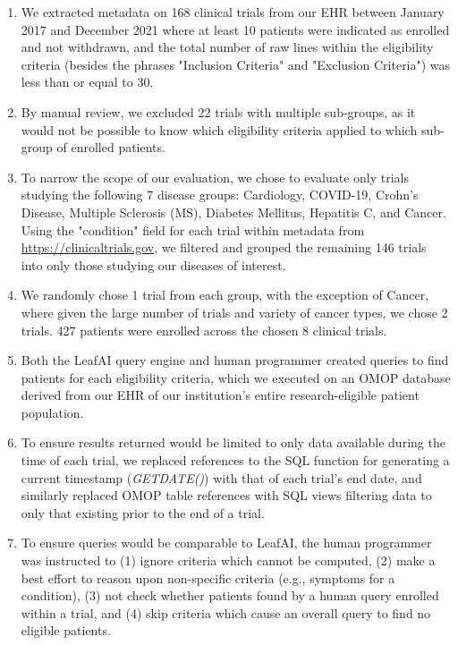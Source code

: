 \documentclass[../main.tex]{subfiles}
\begin{document}
\begin{enumerate}
    \item We extracted metadata on 168 clinical trials from our EHR between January 2017 and December 2021 where at least 10 patients were indicated as enrolled and not withdrawn, and the total number of raw lines within the eligibility criteria (besides the phrases "Inclusion Criteria" and "Exclusion Criteria") was less than or equal to 30.
    \item By manual review, we excluded 22 trials with multiple sub-groups, as it would not be possible to know which eligibility criteria applied to which sub-group of enrolled patients.
    \item To narrow the scope of our evaluation, we chose to evaluate only trials studying the following 7 disease groups: Cardiology, COVID-19, Crohn's Disease, Multiple Sclerosis (MS), Diabetes Mellitus, Hepatitis C, and Cancer. Using the "condition" field for each trial within metadata from \url{https://clinicaltrials.gov}, we filtered and grouped the remaining 146 trials into only those studying our diseases of interest. 
    \item We randomly chose 1 trial from each group, with the exception of Cancer, where given the large number of trials and variety of cancer types, we chose 2 trials. 427 patients were enrolled across the chosen 8 clinical trials.
    \item Both the LeafAI query engine and human programmer created queries to find patients for each eligibility criteria, which we executed on an OMOP database derived from our EHR of our institution's entire research-eligible patient population. 
    \item To ensure results returned would be limited to only data available during the time of each trial, we replaced references to the SQL function for generating a current timestamp (\textit{GETDATE()}) with that of each trial's end date, and similarly replaced OMOP table references with SQL views filtering data to only that existing prior to the end of a trial.
    \item To ensure queries would be comparable to LeafAI, the human programmer was instructed to (1) ignore criteria which cannot be computed, (2) make a best effort to reason upon non-specific criteria (e.g., symptoms for a condition), (3) not check whether patients found by a human query enrolled within a trial, and (4) skip criteria which cause an overall query to find no eligible patients.
\end{enumerate}
\end{document}
